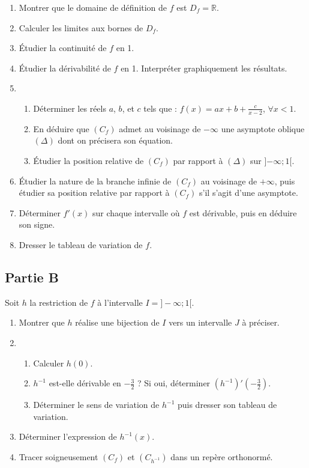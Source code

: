 \documentclass[12pt]{article}
\begin{document}
\begin{enumerate}
    \item Montrer que le domaine de définition de $f$ est $D_f = \mathbb{R}$.
    \item Calculer les limites aux bornes de $D_f$.
    \item Étudier la continuité de $f$ en 1.
    \item Étudier la dérivabilité de $f$ en 1. Interpréter graphiquement les résultats.
    \item 
    \begin{enumerate}
        \item Déterminer les réels $a$, $b$, et $c$ tels que : $f(x) = ax + b + \frac{c}{x-2}$, $\forall x < 1$.
        \item En déduire que $(C_f)$ admet au voisinage de $-\infty$ une asymptote oblique $(\Delta)$ dont on précisera son équation.
        \item Étudier la position relative de $(C_f)$ par rapport à $(\Delta)$ sur ]$-\infty ; 1[$.
    \end{enumerate}
    \item Étudier la nature de la branche infinie de $(C_f)$ au voisinage de $+\infty$, puis étudier sa position relative par rapport à $(C_f)$ s'il s'agit d'une asymptote.
    \item Déterminer $f'(x)$ sur chaque intervalle où $f$ est dérivable, puis en déduire son signe.
    \item Dresser le tableau de variation de $f$.
\end{enumerate}

\subsection*{Partie B}


Soit $h$ la restriction de $f$ à l’intervalle $I = ]-\infty; 1[$.
\begin{enumerate}
    \item Montrer que $h$ réalise une bijection de $I$ vers un intervalle $J$ à préciser.
    \item 
    \begin{enumerate}
        \item Calculer $h(0)$.
        \item $h^{-1}$ est-elle dérivable en $-\frac{3}{2}$ ? Si oui, déterminer $(h^{-1})'\left(-\frac{3}{2}\right)$.
        \item Déterminer le sens de variation de $h^{-1}$ puis dresser son tableau de variation.
    \end{enumerate}
    \item Déterminer l’expression de $h^{-1}(x)$.
    \item Tracer soigneusement $(C_f)$ et $(C_{h^{-1}})$ dans un repère orthonormé.
\end{enumerate}
\end{document}
